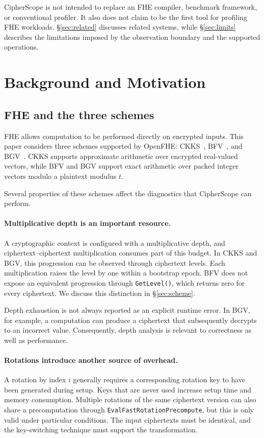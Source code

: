 \documentclass[sigconf,nonacm]{acmart}
\begin{document}
CipherScope is not intended to replace an FHE compiler, benchmark framework,
or conventional profiler. It also does not claim to be the first tool for
profiling FHE workloads. \S\ref{sec:related} discusses related systems, while
\S\ref{sec:limits} describes the limitations imposed by the observation
boundary and the supported operations.

\section{Background and Motivation}
\label{sec:background}

\subsection{FHE and the three schemes}

FHE allows computation to be performed directly on encrypted inputs. This
paper considers three schemes supported by OpenFHE: CKKS~\cite{ckks2017},
BFV~\cite{brakerski2012,fv2012}, and BGV~\cite{bgv2012}. CKKS supports
approximate arithmetic over encrypted real-valued vectors, while BFV and BGV
support exact arithmetic over packed integer vectors modulo a plaintext
modulus $t$.

Several properties of these schemes affect the diagnostics that CipherScope
can perform.

\paragraph{Multiplicative depth is an important resource.} A cryptographic
context is configured with a multiplicative depth, and
ciphertext--ciphertext multiplication consumes part of this budget. In CKKS
and BGV, this progression can be observed through ciphertext levels. Each
multiplication raises the level by one within a bootstrap epoch. BFV does not
expose an equivalent progression through \texttt{GetLevel()}, which returns
zero for every ciphertext. We discuss this distinction in
\S\ref{sec:scheme}.

Depth exhaustion is not always reported as an explicit runtime error. In BGV,
for example, a computation can produce a ciphertext that subsequently
decrypts to an incorrect value. Consequently, depth analysis is relevant to
correctness as well as performance.

\paragraph{Rotations introduce another source of overhead.} A rotation by
index $i$ generally requires a corresponding rotation key to have been
generated during setup. Keys that are never used increase setup time and
memory consumption. Multiple rotations of the same ciphertext version can
also share a precomputation through \texttt{EvalFastRotationPrecompute}, but
this is only valid under particular conditions. The input ciphertexts must be
identical, and the key-switching technique must support the transformation.
\end{document}
